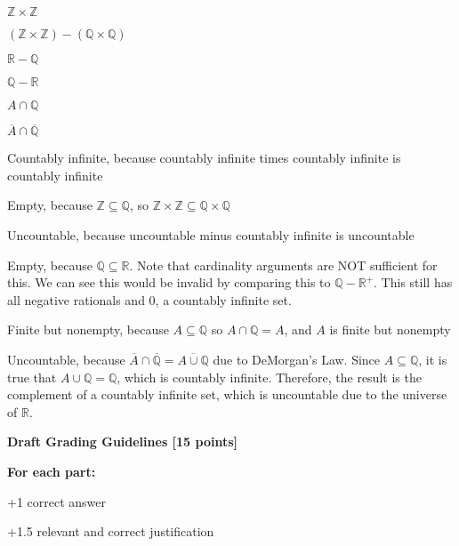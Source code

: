 \documentclass[12pt]{exam}
\begin{document}
\begin{qparts}
    \item $\mathbb{Z} \times \mathbb{Z}$
    \item $(\mathbb{Z} \times \mathbb{Z}) - (\mathbb{Q} \times \mathbb{Q})$
    \item $\mathbb{R} - \mathbb{Q}$
    \item $\mathbb{Q} - \mathbb{R}$
    \item $A \cap \mathbb{Q}$
    \item $\overline{A} \cap \overline{\mathbb{Q}}$
\end{qparts}

\begin{solution}
\begin{qparts}
    \item Countably infinite, because countably infinite times countably infinite is countably infinite
    \item Empty, because $\mathbb{Z} \subseteq \mathbb{Q}$, so $\mathbb{Z} \times \mathbb{Z} \subseteq \mathbb{Q} \times \mathbb{Q}$
    \item Uncountable, because uncountable minus countably infinite is uncountable
    \item Empty, because $\mathbb{Q} \subseteq \mathbb{R}$.  Note that cardinality arguments are NOT sufficient for this.  We can see this would be invalid by comparing this to $\mathbb{Q}-\mathbb{R}^+$.  This still has all negative rationals and 0, a countably infinite set.
    \item Finite but nonempty, because $A \subseteq \mathbb{Q}$ so $A \cap \mathbb{Q} = A$, and $A$ is finite but nonempty
    \item Uncountable, because $\overline{A} \cap \overline{\mathbb{Q}} = \overline{A \cup \mathbb{Q}}$ due to DeMorgan's Law. Since $A \subseteq \mathbb{Q}$, it is true that $A \cup \mathbb{Q} = \mathbb{Q}$, which is countably infinite. Therefore, the result is the complement of a countably infinite set, which is uncountable due to the universe of $\mathbb{R}$.
\end{qparts}

\smallskip
\textbf{Draft Grading Guidelines [15 points]}

\textbf{For each part:}
\begin{guidelines}
    \item +1 correct answer
    \item +1.5 relevant and correct justification
\end{guidelines}
\end{solution}
\end{document}
